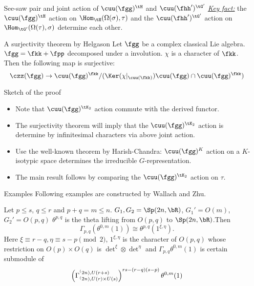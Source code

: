 \documentclass[final,hyperref={pdfpagelabels=false}]{beamer} %
\def\emph#1{{\em \underline{#1}}}
\begin{document}
\begin{frame}
\begin{columns}[t]
\begin{column}{.48\linewidth}
\begin{block}{See-saw pair and  joint action of $\cuu(\fgg)^\tH$ 
and $\cuu(\fhh')^{\tG'}$}
\emph{Key fact:} the $\cuu(\fgg)^\tH$ action on $\Hom_\tH(\Omega(\sigma),\tau)$ and the $\cuu(\fhh')^{\tG'}$  action on $\Hom_{\tG'}(\Omega(\tau),\sigma)$ determine  each other.
\end{block}

\begin{block}{A surjectivity theorem by Helgason}
  Let $\fgg$ be a complex classical Lie algebra.  
  $\fgg = \fkk+\fpp$ decomposed under a involution. 
  $\chi$ is a character of $\fkk$.
   Then the following map is surjective:
  \[
  \czz(\fgg) \to \cuu(\fgg)^\fkk/(\Ker(\chi|_{\cuu(\fkk)})\cuu(\fgg)\cap\cuu(\fgg)^\fkk)
  \]
\end{block}

\begin{block}{Sketch of the proof}
  \begin{itemize}
  \item 
  Note that $\cuu(\fgg)^{\tK_2}$ action commute with the derived functor.
\item 
  The surjectivity theorem will imply that the $\cuu(\fgg)^{\tK_2}$ action is determine by
  infinitesimal characters via above joint action.
\item Use the well-known theorem by Harish-Chandra: $\cuu(\fgg)^{K}$ action on a $K$-isotypic space determines the  irreducible $G$-representation.
\item 
  The main result follows by comparing the $\cuu(\fgg)^{\tK_2}$ action on $\tau$.
\end{itemize}
% 
\end{block}

\begin{block}{Examples}
      Following examples are constructed by Wallach and Zhu.

      Let $p\leq s$, $q\leq r$ and $p+q=m\leq n$.  
      $G_1,G_2 = \Sp(2n,\bR)$, $G_1' = O(m)$, $G_2'=O(p,q)$ 
      $\theta^{p,q}$ is the theta lifting from $O(p,q)$ to
      $\Sp(2n,\bR)$.Then 
      \[
      \displaystyle
      \Gamma_{p,q}(\theta^{0,m}(1)) \cong \theta^{p,q}(1^{\xi,\eta}).\]
      Here $ \xi \equiv r-q, \eta\equiv s-p \pmod{2}$,
      $1^{\xi,\eta}$ is the character of $O(p,q)$
      whose restriction on $O(p)\times O(q)$ is
      $\det^\xi\otimes \det^\eta$ and
      $\Gamma_{p,q}\theta^{0,m}(1)$ is certain submodule of
      \[
      \left(\Gamma_{\sp(2n),U(r)\times U(s)}^{\sp(2n),
          U(r+s)}\right)^{rs-(r-q)(s-p)}\theta^{0,m}(1)
      \]
    \end{block}
 

\end{column}
\end{columns}
\end{frame}
\end{document}

